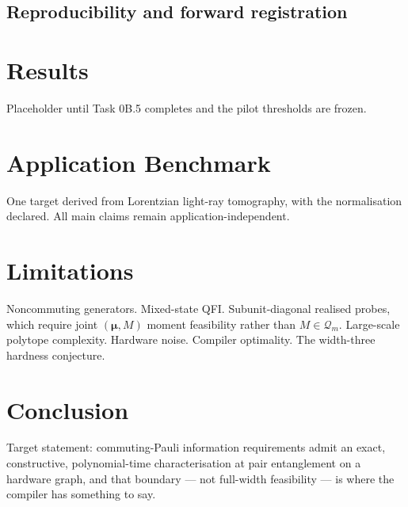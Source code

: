 \documentclass[11pt]{article}
\begin{document}
\subsection{Reproducibility and forward registration}

\section{Results}
Placeholder until Task 0B.5 completes and the pilot thresholds are frozen.

\section{Application Benchmark}
One target derived from Lorentzian light-ray tomography, with the normalisation declared. All
main claims remain application-independent.

\section{Limitations}
Noncommuting generators. Mixed-state QFI. Subunit-diagonal realised probes, which require
joint $(\bm\mu,M)$ moment feasibility rather than $M\in\mathcal Q_m$. Large-scale polytope
complexity. Hardware noise. Compiler optimality. The width-three hardness conjecture.

\section{Conclusion}
Target statement: commuting-Pauli information requirements admit an exact, constructive,
polynomial-time characterisation at pair entanglement on a hardware graph, and that boundary
--- not full-width feasibility --- is where the compiler has something to say.
\end{document}
